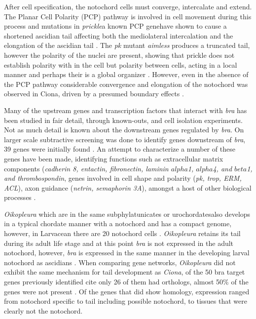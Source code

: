 After cell specification, the notochord cells must converge, intercalate and extend. The Planar Cell Polarity (PCP) pathway is involved in cell movement during this process and mutations in \textit{prickle}\textemdash a known PCP gene\textemdash have shown to cause a shortened ascidian tail affecting both the mediolateral intercalation and the elongation of the ascidian tail \cite{jiang_ascidian_2005}. The \textit{pk} mutant \textit{aimless} produces a truncated tail, however the polarity of the nuclei are present, showing that prickle does not establish polarity with in the cell but polarity between cells, acting in a local manner and perhaps their is a global organizer \cite{jiang_ascidian_2005,kourakis_one-dimensional_2014}. However, even in the absence of the PCP pathway considerable convergence and elongation of the notochord was observed in Ciona, driven by a presumed boundary effects \cite{veeman_chongmague_2008}.

Many of the upstream genes and transcription factors that interact with \textit{bra} has been studied in fair detail, through known-outs, and cell isolation experiments. Not as much detail is known about the downstream genes regulated by \textit{bra}. On larger scale subtractive screening was done to identify genes downstream of \textit{bra}, 39 genes were initially found \cite{hotta_temporal_1999}. An attempt to characterize a number of these genes have been made, identifying functions such as extracellular matrix components (\textit{cadherin 8, entactin, fibronectin, laminin $alpha$1, $alpha$4, and $beta$1, and thrombospondin}, genes involved in cell shape and polarity (\textit{pk, trop, ERM, ACL}), axon guidance (\textit{netrin, semaphorin 3A}), amongst a host of other biological processes \cite{hotta_characterization_2000,hotta_brachyury-downstream_2007,kugler_evolutionary_2008}. 

\textit{Oikopleura} which are in the same subphyla\textemdash tunicates or urochordates\textemdash also develops in a typical chordate manner with a notochord and has a compact genome, however, in Larvacean there are 20 notochord cells \cite{seo_miniature_2001,denoeud_plasticity_2010}. \textit{Oikopleura} retains its tail during its adult life stage and at this point \textit{bra} is not expressed in the adult notochord, however, \textit{bra} is expressed in the same manner in the developing larval notochord as ascidians \cite{bassham_brachyury_2000,nishida_development_2008}. When comparing gene networks, \textit{Oikopleura} did not exhibit the same mechanism for tail development as \textit{Ciona}, of the 50 bra target genes previously identified cite only 26 of them had orthologs, almost 50\% of the genes were not present \cite{kugler_evolutionary_2011}. Of the genes that did show homology, expression ranged from notochord specific to tail including possible notochord, to tissues that were clearly not the notochord.



